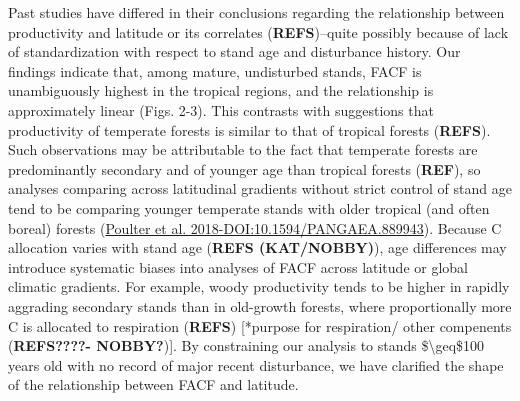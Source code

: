 \documentclass[]{article}
\begin{document}
Past studies have differed in their conclusions regarding the
relationship between productivity and latitude or its correlates
(\textbf{REFS})--quite possibly because of lack of standardization with
respect to stand age and disturbance history. Our findings indicate
that, among mature, undisturbed stands, FACF is unambiguously highest in
the tropical regions, and the relationship is approximately linear
(Figs. 2-3). This contrasts with suggestions that productivity of
temperate forests is similar to that of tropical forests
(\textbf{REFS}). Such observations may be attributable to the fact that
temperate forests are predominantly secondary and of younger age than
tropical forests (\textbf{REF}), so analyses comparing across
latitudinal gradients without strict control of stand age tend to be
comparing younger temperate stands with older tropical (and often
boreal) forests (\href{http://pure.iiasa.ac.at/id/eprint/15361/}{Poulter
et al. 2018-DOI:10.1594/PANGAEA.889943}). Because C allocation varies
with stand age (\textbf{REFS (KAT/NOBBY)}), age differences may
introduce systematic biases into analyses of FACF across latitude or
global climatic gradients. For example, woody productivity tends to be
higher in rapidly aggrading secondary stands than in old-growth forests,
where proportionally more C is allocated to respiration (\textbf{REFS})
{[}*purpose for respiration/ other compenents (\textbf{REFS????-
NOBBY?}){]}. By constraining our analysis to stands
\$\textbackslash{}geq\$100 years old with no record of major recent
disturbance, we have clarified the shape of the relationship between
FACF and latitude.
\end{document}
